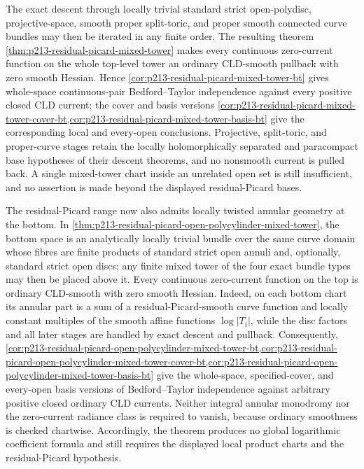 The exact descent through locally trivial standard strict open-polydisc,
projective-space, smooth proper split-toric, and proper smooth connected
curve bundles may then be iterated in any finite order.  The resulting
theorem
\cref{thm:p213-residual-picard-mixed-tower} makes every continuous
zero-current function on the whole top-level tower an ordinary CLD-smooth
pullback with zero smooth Hessian.  Hence
\cref{cor:p213-residual-picard-mixed-tower-bt} gives whole-space
continuous-pair Bedford--Taylor independence against every positive closed
CLD current; the cover and basis versions
\cref{cor:p213-residual-picard-mixed-tower-cover-bt,cor:p213-residual-picard-mixed-tower-basis-bt}
give the corresponding local and every-open conclusions.  Projective,
split-toric, and proper-curve stages retain the locally holomorphically
separated and paracompact base hypotheses of their descent theorems, and no nonsmooth
current is pulled back.  A single mixed-tower chart inside an unrelated
open set is still insufficient, and no assertion is made beyond the
displayed residual-Picard bases.

The residual-Picard range now also admits locally twisted annular geometry
at the bottom.  In
\cref{thm:p213-residual-picard-open-polycylinder-mixed-tower}, the bottom
space is an analytically locally trivial bundle over the same curve domain
whose fibres are finite products of standard strict open annuli and,
optionally, standard strict open discs; any finite mixed tower of the four
exact bundle types may then be placed above it.  Every continuous
zero-current function on the top is ordinary CLD-smooth with zero smooth
Hessian.  Indeed, on each bottom chart its annular part is a sum of a
residual-Picard-smooth curve function and locally constant multiples of the
smooth affine functions \(\log|T_i|\), while the disc factors and all later
stages are handled by exact descent and pullback.  Consequently,
\cref{cor:p213-residual-picard-open-polycylinder-mixed-tower-bt,cor:p213-residual-picard-open-polycylinder-mixed-tower-cover-bt,cor:p213-residual-picard-open-polycylinder-mixed-tower-basis-bt}
give the whole-space, specified-cover, and every-open basis versions of
Bedford--Taylor independence against arbitrary positive closed ordinary CLD
currents.  Neither integral annular monodromy nor the zero-current radiance
class is required to vanish, because ordinary smoothness is checked
chartwise.  Accordingly, the theorem produces no global logarithmic
coefficient formula and still requires the displayed local product charts
and the residual-Picard hypothesis.

